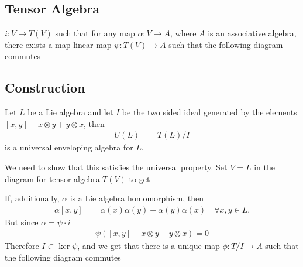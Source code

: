\subsection{Tensor Algebra}
\label{sub:tensor_algebra}
$i:V\to T(V)$ such that for any map $\alpha: V\to A$, where $A$ is an associative algebra, there exists a map linear map $\psi: T(V)\to A$ such that the following diagram commutes



\begin{center}
\end{center}


\subsection{Construction}
\label{sub:construction}
Let $L$ be a Lie algebra and let $I$ be the two sided ideal generated by the elements $[x,y]-x\otimes y + y\otimes x$, then
\begin{align}
    U(L) &= T(L)/I
\end{align} 
is a universal enveloping algebra for $L$.

We need to show that this satisfies the universal property. Set $V=L$ in the diagram for tensor algebra $T(V)$ to get

\begin{center}
\end{center}
If, additionally, $\alpha$ is a Lie algebra homomorphism, then 
\begin{align}
    \alpha[x,y] &= \alpha(x)\alpha(y) -\alpha(y) \alpha(x)\quad\forall x,y\in L.
\end{align}
But since $\alpha=\psi\cdot i$
\begin{align}
    \psi([x,y] -x\otimes y - y\otimes x) =0
\end{align}
Therefore $I\subset \ker \psi$, and we get that there is a unique map $\overline\phi: T/I \to A$ such that the following diagram commutes

